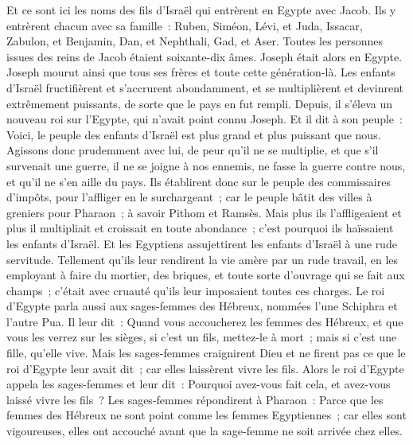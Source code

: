 \begin{multicols}{2}
\VerseOne{}Et ce sont ici les noms des fils d'Israël qui entrèrent en Egypte avec Jacob. Ils y entrèrent chacun avec sa famille~: 
Ruben, Siméon, Lévi, et Juda,
Issacar, Zabulon, et Benjamin,
Dan, et Nephthali, Gad, et Aser.
Toutes les personnes issues des reins de Jacob étaient soixante-dix âmes. Joseph était alors en Egypte.
Joseph mourut ainsi que tous ses frères et toute cette génération-là.
Les enfants d'Israël fructifièrent et s'accrurent abondamment, et se multiplièrent et devinrent extrêmement puissants, de sorte que le pays en fut rempli.
Depuis, il s'éleva un nouveau roi sur l'Egypte, qui n'avait point connu Joseph.
Et il dit à son peuple~: Voici, le peuple des enfants d'Israël est plus grand et plus puissant que nous.
Agissons donc prudemment avec lui, de peur qu'il ne se multiplie, et que s'il survenait une guerre, il ne se joigne à nos ennemis, ne fasse la guerre contre nous, et qu'il ne s'en aille du pays.
Ils établirent donc sur le peuple des commissaires d'impôts, pour l'affliger en le surchargeant~; car le peuple bâtit des villes à greniers pour Pharaon~; à savoir Pithom et Ramsès.
Mais plus ils l'affligeaient et plus il multipliait et croissait en toute abondance~; c'est pourquoi ils haïssaient les enfants d'Israël.
Et les Egyptiens assujettirent les enfants d'Israël à une rude servitude.
Tellement qu'ils leur rendirent la vie amère par un rude travail, en les employant à faire du mortier, des briques, et toute sorte d'ouvrage qui se fait aux champs~; c'était avec cruauté qu'ils leur imposaient toutes ces charges.
Le roi d'Egypte parla aussi aux sages-femmes des Hébreux, nommées l'une Schiphra et l'autre Pua.
Il leur dit~: Quand vous accoucherez les femmes des Hébreux, et que vous les verrez sur les sièges, si c'est un fils, mettez-le à mort~; mais si c'est une fille, qu'elle vive.
Mais les sages-femmes craignirent Dieu et ne firent pas ce que le roi d'Egypte leur avait dit~; car elles laissèrent vivre les fils.
Alors le roi d'Egypte appela les sages-femmes et leur dit~: Pourquoi avez-vous fait cela, et avez-vous laissé vivre les fils~?
Les sages-femmes répondirent à Pharaon~: Parce que les femmes des Hébreux ne sont point comme les femmes Egyptiennes~; car elles sont vigoureuses, elles ont accouché avant que la sage-femme ne soit arrivée chez elles.

\end{multicols}
